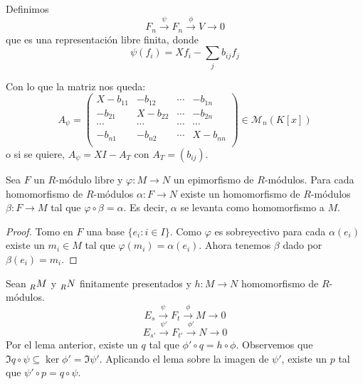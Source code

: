Definimos
\[
  F_n\overset{\psi}{\longrightarrow} F_n\overset{\phi}{\longrightarrow}
  V\longrightarrow 0
\]
que es una representación libre finita, donde
\[
  \psi(f_i)=Xf_i-\sum_j b_{ij}f_j
\]

Con lo que la matriz nos queda:
\[
  A_\psi=
  \begin{pmatrix}
    X-b_{11}  & -b_{12}&\cdots&-b_{1n}\\
    -b_{21}  & X-b_{22}&\cdots&-b_{2n}\\
    \cdots&\cdots&\cdots&\cdots\\
    -b_{n1}  & -b_{n2}&\cdots&X-b_{nn}\\
  \end{pmatrix}\in\mathcal{M}_n(K[x])
\]
o si se quiere, \(A_\psi=XI-A_T\) con \(A_T=(b_{ij})\).

\begin{lema}
  Sea \(F\) un \(R\)-módulo libre y \(\varphi:M\longrightarrow N\) un
  epimorfismo de \(R\)-módulos. Para cada homomorfismo de \(R\)-módulos
  \(\alpha:F\longrightarrow N\) existe un homomorfismo de \(R\)-módulos
  \(\beta: F\longrightarrow M\) tal que \(\varphi\circ\beta=\alpha\).
  Es decir, \(\alpha\) se levanta como homomorfismo a \(M\).
\end{lema}
\begin{proof}
  Tomo en \(F\) una base \(\{e_i:i\in I\}\). Como \(\varphi\) es sobreyectivo
  para cada \(\alpha(e_i)\) existe un \(m_i\in M\) tal que \(\varphi(m_i)
  =\alpha(e_i)\).
  Ahora tenemos \(\beta\) dado por \(\beta(e_i)=m_i\).

\end{proof}

Sean \(\prescript{}{R}{M}\) y \(\prescript{}{R}{N}\) finitamente
presentados y \(h:M\longrightarrow N\) homomorfismo de \(R\)-módulos.
\[
  E_s\overset{\psi}{\longrightarrow}
  F_t\overset{\phi}{\longrightarrow} M\longrightarrow 0
\]
\[
  E_{s'}\overset{\psi'}{\longrightarrow}
  F_{t'}\overset{\phi'}{\longrightarrow} N\longrightarrow 0
\]
Por el lema anterior, existe un \(q\) tal que \(\phi'\circ q=h\circ\phi\).
Observemos que \(\Im q\circ\psi\subseteq \ker\phi'=\Im\psi'\).
Aplicando el lema sobre la imagen de \(\psi'\), existe un
\(p\) tal que \(\psi'\circ p=q\circ\psi\).

